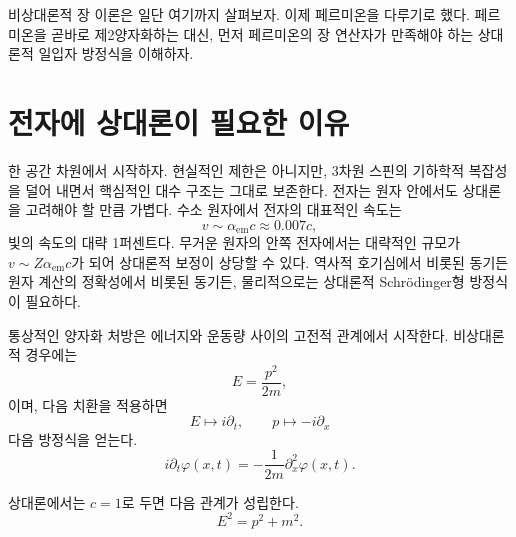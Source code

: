 \begin{classroomqa}\end{classroomqa}

비상대론적 장 이론은 일단 여기까지 살펴보자. 이제 페르미온을 다루기로 했다. 페르미온을 곧바로 제2양자화하는 대신, 먼저 페르미온의 장 연산자가 만족해야 하는 상대론적 일입자 방정식을 이해하자.

\section{전자에 상대론이 필요한 이유}

한 공간 차원에서 시작하자. 현실적인 제한은 아니지만, 3차원 스핀의 기하학적 복잡성을 덜어 내면서 핵심적인 대수 구조는 그대로 보존한다. 전자는 원자 안에서도 상대론을 고려해야 할 만큼 가볍다. 수소 원자에서 전자의 대표적인 속도는
\begin{equation}
v\sim\alpha_{\mathrm{em}}c\approx 0.007c,
\end{equation}
빛의 속도의 대략 1퍼센트다. 무거운 원자의 안쪽 전자에서는 대략적인 규모가 \(v\sim Z\alpha_{\mathrm{em}}c\)가 되어 상대론적 보정이 상당할 수 있다. 역사적 호기심에서 비롯된 동기든 원자 계산의 정확성에서 비롯된 동기든, 물리적으로는 상대론적 Schr\"odinger형 방정식이 필요하다.

통상적인 양자화 처방은 에너지와 운동량 사이의 고전적 관계에서 시작한다. 비상대론적 경우에는
\begin{equation}
E=\frac{p^2}{2m},
\end{equation}
이며, 다음 치환을 적용하면
\begin{equation}
E\mapsto i\partial_t,
\qquad
p\mapsto-i\partial_x
\end{equation}
다음 방정식을 얻는다.
\begin{equation}
i\partial_t\varphi(x,t)
=-\frac{1}{2m}\partial_x^2\varphi(x,t).
\end{equation}

상대론에서는 \(c=1\)로 두면 다음 관계가 성립한다.
\begin{equation}
E^2=p^2+m^2.
\label{eq:l9-rel-dispersion}
\end{equation}

